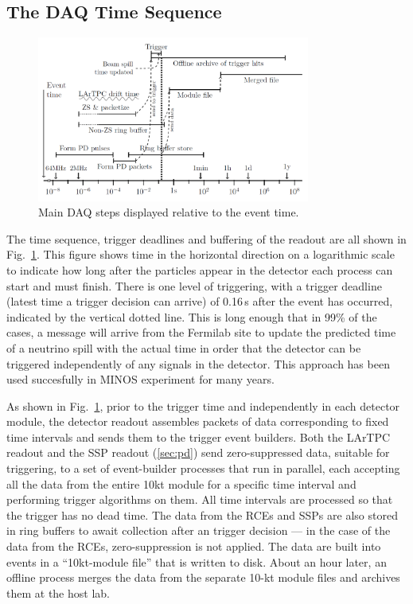 \subsection{The DAQ Time Sequence}
\begin{figure}[h!]
	\centering
	\includegraphics[width=0.8\textwidth]{daq-steps.png}
	\caption{Main DAQ steps displayed relative to the event time.}
	\label{fig:fddaqtime}
\end{figure}
\noindent
The time sequence, trigger deadlines and buffering of the readout are all
shown in Fig.~\ref{fig:fddaqtime}.  This figure shows time in the
horizontal direction on a logarithmic scale to indicate how long after
the particles appear in the detector each process can start and must
finish.  There is one level of triggering, with a trigger deadline
(latest time a trigger decision can arrive) of
0.16\,s after the event has occurred, indicated by the vertical dotted
line.  This is long enough that in 99\% of the cases, a message will
arrive from the Fermilab site to update the predicted time of a
neutrino spill with the actual time in order that the detector can be
triggered independently of any signals in the detector.  This approach
has been used succesfully in MINOS experiment for many years.  

As shown in Fig.~\ref{fig:fddaqtime}, prior to the trigger time and
independently in each detector module, the detector readout assembles
packets of data corresponding to fixed time intervals and sends them
to the trigger event builders.  Both the LArTPC readout and the SSP
readout (\ref{sec:pd}) send zero-suppressed data, suitable for triggering, to a set
of event-builder processes that run in parallel, each accepting all
the data from the entire 10kt module for a specific time interval and
performing trigger algorithms on them.  All time intervals are
processed so that the trigger has no dead time.  The data from the RCEs and SSPs
are also stored in ring buffers to await collection after an
trigger decision --- in the case of the data from the RCEs, 
zero-suppression is not applied.  The data are built into events in a ``10kt-module
file'' that is written to disk.  About an hour later, an offline process merges
the data from the separate 10-kt module files and archives them at the host lab.

